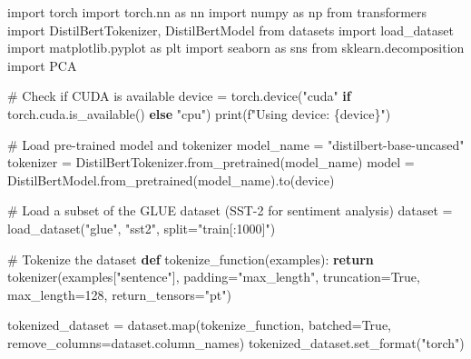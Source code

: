 \documentclass[
  letterpaper,
  DIV=11,
  numbers=noendperiod]{scrreprt}
\newenvironment{Shaded}{\begin{snugshade}}{\end{snugshade}}
\newcommand{\BuiltInTok}[1]{\textcolor[rgb]{0.00,0.23,0.31}{#1}}
\newcommand{\CommentTok}[1]{\textcolor[rgb]{0.37,0.37,0.37}{#1}}
\newcommand{\ControlFlowTok}[1]{\textcolor[rgb]{0.00,0.23,0.31}{\textbf{#1}}}
\newcommand{\DecValTok}[1]{\textcolor[rgb]{0.68,0.00,0.00}{#1}}
\newcommand{\ImportTok}[1]{\textcolor[rgb]{0.00,0.46,0.62}{#1}}
\newcommand{\KeywordTok}[1]{\textcolor[rgb]{0.00,0.23,0.31}{\textbf{#1}}}
\newcommand{\NormalTok}[1]{\textcolor[rgb]{0.00,0.23,0.31}{#1}}
\newcommand{\OperatorTok}[1]{\textcolor[rgb]{0.37,0.37,0.37}{#1}}
\newcommand{\SpecialCharTok}[1]{\textcolor[rgb]{0.37,0.37,0.37}{#1}}
\newcommand{\SpecialStringTok}[1]{\textcolor[rgb]{0.13,0.47,0.30}{#1}}
\newcommand{\StringTok}[1]{\textcolor[rgb]{0.13,0.47,0.30}{#1}}
\newcommand{\VariableTok}[1]{\textcolor[rgb]{0.07,0.07,0.07}{#1}}
\begin{document}
\begin{Shaded}
\begin{Highlighting}[]
\ImportTok{import}\NormalTok{ torch}
\ImportTok{import}\NormalTok{ torch.nn }\ImportTok{as}\NormalTok{ nn}
\ImportTok{import}\NormalTok{ numpy }\ImportTok{as}\NormalTok{ np}
\ImportTok{from}\NormalTok{ transformers }\ImportTok{import}\NormalTok{ DistilBertTokenizer, DistilBertModel}
\ImportTok{from}\NormalTok{ datasets }\ImportTok{import}\NormalTok{ load\_dataset}
\ImportTok{import}\NormalTok{ matplotlib.pyplot }\ImportTok{as}\NormalTok{ plt}
\ImportTok{import}\NormalTok{ seaborn }\ImportTok{as}\NormalTok{ sns}
\ImportTok{from}\NormalTok{ sklearn.decomposition }\ImportTok{import}\NormalTok{ PCA}

\CommentTok{\# Check if CUDA is available}
\NormalTok{device }\OperatorTok{=}\NormalTok{ torch.device(}\StringTok{"cuda"} \ControlFlowTok{if}\NormalTok{ torch.cuda.is\_available() }\ControlFlowTok{else} \StringTok{"cpu"}\NormalTok{)}
\BuiltInTok{print}\NormalTok{(}\SpecialStringTok{f"Using device: }\SpecialCharTok{\{}\NormalTok{device}\SpecialCharTok{\}}\SpecialStringTok{"}\NormalTok{)}

\CommentTok{\# Load pre{-}trained model and tokenizer}
\NormalTok{model\_name }\OperatorTok{=} \StringTok{"distilbert{-}base{-}uncased"}
\NormalTok{tokenizer }\OperatorTok{=}\NormalTok{ DistilBertTokenizer.from\_pretrained(model\_name)}
\NormalTok{model }\OperatorTok{=}\NormalTok{ DistilBertModel.from\_pretrained(model\_name).to(device)}

\CommentTok{\# Load a subset of the GLUE dataset (SST{-}2 for sentiment analysis)}
\NormalTok{dataset }\OperatorTok{=}\NormalTok{ load\_dataset(}\StringTok{"glue"}\NormalTok{, }\StringTok{"sst2"}\NormalTok{, split}\OperatorTok{=}\StringTok{"train[:1000]"}\NormalTok{)}

\CommentTok{\# Tokenize the dataset}
\KeywordTok{def}\NormalTok{ tokenize\_function(examples):}
    \ControlFlowTok{return}\NormalTok{ tokenizer(examples[}\StringTok{"sentence"}\NormalTok{], padding}\OperatorTok{=}\StringTok{"max\_length"}\NormalTok{, truncation}\OperatorTok{=}\VariableTok{True}\NormalTok{, max\_length}\OperatorTok{=}\DecValTok{128}\NormalTok{, return\_tensors}\OperatorTok{=}\StringTok{"pt"}\NormalTok{)}

\NormalTok{tokenized\_dataset }\OperatorTok{=}\NormalTok{ dataset.}\BuiltInTok{map}\NormalTok{(tokenize\_function, batched}\OperatorTok{=}\VariableTok{True}\NormalTok{, remove\_columns}\OperatorTok{=}\NormalTok{dataset.column\_names)}
\NormalTok{tokenized\_dataset.set\_format(}\StringTok{"torch"}\NormalTok{)}


\end{Highlighting}
\end{Shaded}
\end{document}

